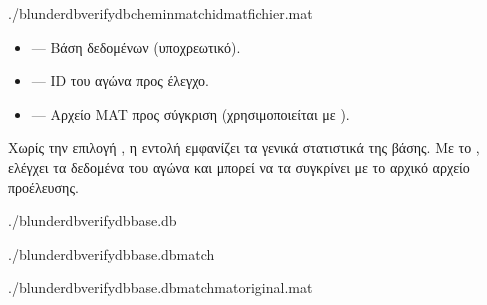 \documentclass[letterpaper,10pt,greek]{sphinxmanual}
\begin{document}
\begin{sphinxVerbatim}[commandchars=\\\{\}]
./blunderdbverify\PYGZhy{}\PYGZhy{}db\PYGZlt{}chemin\PYGZgt{}\PYG{o}{[}\PYGZhy{}\PYGZhy{}match\PYGZlt{}id\PYGZgt{}\PYG{o}{]}\PYG{o}{[}\PYGZhy{}\PYGZhy{}mat\PYGZlt{}fichier.mat\PYGZgt{}\PYG{o}{]}
\end{sphinxVerbatim}

\sphinxAtStartPar
{}
\begin{itemize}
\item {} 
\sphinxAtStartPar
{} — Βάση δεδομένων (υποχρεωτικό).

\item {} 
\sphinxAtStartPar
{} — ID του αγώνα προς έλεγχο.

\item {} 
\sphinxAtStartPar
{} — Αρχείο MAT προς σύγκριση (χρησιμοποιείται με ).

\end{itemize}

\sphinxAtStartPar
Χωρίς την επιλογή , η εντολή εμφανίζει τα γενικά στατιστικά της βάσης. Με το , ελέγχει τα δεδομένα του αγώνα και μπορεί να τα συγκρίνει με το αρχικό αρχείο προέλευσης.

\sphinxAtStartPar
{}

\begin{sphinxVerbatim}[commandchars=\\\{\}]
./blunderdbverify\PYGZhy{}\PYGZhy{}dbbase.db

./blunderdbverify\PYGZhy{}\PYGZhy{}dbbase.db\PYGZhy{}\PYGZhy{}match

./blunderdbverify\PYGZhy{}\PYGZhy{}dbbase.db\PYGZhy{}\PYGZhy{}match\PYGZhy{}\PYGZhy{}matoriginal.mat
\end{sphinxVerbatim}
\end{document}
